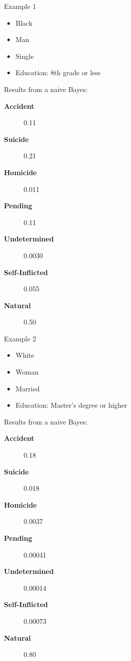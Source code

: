 \documentclass[xcolor=table]{beamer}
\begin{document}
\begin{frame}{Example 1}
  \begin{itemize}
    \item Black
    \item Man
    \item Single
    \item Education: 8th grade or less
  \end{itemize}
  
  Results from a naive Bayes:
  \begin{description}
    \item [\textbf{Accident}] 0.11
    \item [\textbf{Suicide}] 0.21
    \item [\textbf{Homicide}] 0.011
    \item [\textbf{Pending}] 0.11
    \item [\textbf{Undetermined}] 0.0030
    \item [\textbf{Self-Inflicted}] 0.055
    \item [\textbf{Natural}] 0.50
  \end{description}
\end{frame}

\begin{frame}{Example 2}
  \begin{itemize}
    \item White
    \item Woman
    \item Married
    \item Education: Master's degree or higher
  \end{itemize}
  
  Results from a naive Bayes:
  \begin{description}
    \item [\textbf{Accident}] 0.18
    \item [\textbf{Suicide}] 0.018
    \item [\textbf{Homicide}] 0.0037
    \item [\textbf{Pending}] 0.00041
    \item [\textbf{Undetermined}] 0.00014
    \item [\textbf{Self-Inflicted}] 0.00073
    \item [\textbf{Natural}] 0.80
  \end{description}
\end{frame}
	
\end{document}

